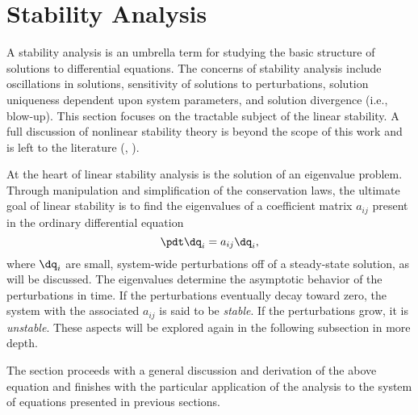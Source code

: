 \section{Stability Analysis}\label{Section:StabilityTheory}
A stability analysis is an umbrella term for studying the basic structure of solutions to differential equations.
The concerns of stability analysis include oscillations in solutions, sensitivity of solutions to perturbations, solution uniqueness dependent upon system parameters, and solution divergence (i.e., blow-up).
This section focuses on the tractable subject of the linear stability.
A full discussion of nonlinear stability theory is beyond the scope of this work and is left to the literature (\eg, \cite{guckenheimer_nonlinear_1983,galaktionov_stability_2004}).

At the heart of linear stability analysis is the solution of an eigenvalue problem.
Through manipulation and simplification of the conservation laws, the ultimate goal of linear stability is to find the eigenvalues of a coefficient matrix $a_{ij}$ present in the ordinary differential equation
\begin{equation}
    \pdt \dq_i = a_{ij} \dq_i,
\end{equation}
where $\dq_i$ are small, system-wide perturbations off of a steady-state solution, as will be discussed.
The eigenvalues determine the asymptotic behavior of the perturbations in time.
If the perturbations eventually decay toward zero, the system with the associated $a_{ij}$ is said to be \emph{stable}.
If the perturbations grow, it is \emph{unstable}.
These aspects will be explored again in the following subsection in more depth.

The section proceeds with a general discussion and derivation of the above equation and finishes with the particular application of the analysis to the system of equations presented in previous sections.




